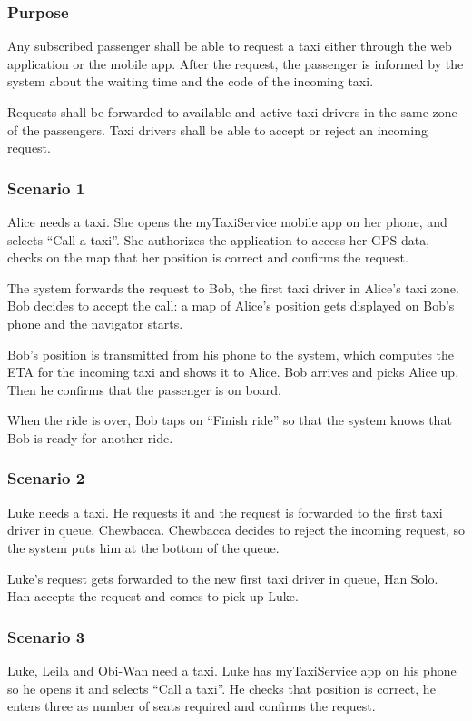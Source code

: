 \label{standard-call}
\subsubsection{Purpose}

Any subscribed passenger shall be able to request a taxi either through the web application or the mobile app.
After the request, the passenger is informed by the system about the waiting time and the code of the incoming taxi.

Requests shall be forwarded to available and active taxi drivers in the same zone of the passengers. Taxi drivers shall be able to accept or reject an incoming request.

\subsubsection{Scenario 1}
Alice needs a taxi. She opens the myTaxiService mobile app on her phone, and selects ``Call a taxi''. She authorizes the application to access her GPS data, checks on the map that her position is correct and confirms the request.

The system forwards the request to Bob, the first taxi driver in Alice's taxi zone. Bob decides to accept the call: a map of Alice's position gets displayed on Bob's phone and the navigator starts.

Bob's position is transmitted from his phone to the system, which computes the ETA for the incoming taxi and shows it to Alice. Bob arrives and picks Alice up. Then he confirms that the passenger is on board.

When the ride is over, Bob taps on ``Finish ride'' so that the system knows that Bob is ready for another ride.

\subsubsection{Scenario 2}
Luke needs a taxi. He requests it and the request is forwarded to the first taxi driver in queue, Chewbacca. Chewbacca decides to reject the incoming request, so the system puts him at the bottom of the queue.

Luke's request gets forwarded to the new first taxi driver in queue, Han Solo. Han accepts the request and comes to pick up Luke.

\subsubsection{Scenario 3}
Luke, Leila and Obi-Wan need a taxi. Luke has myTaxiService app on his phone so he opens it and selects ``Call a taxi''. He checks that position is correct, he enters three as number of seats required and confirms the request.

